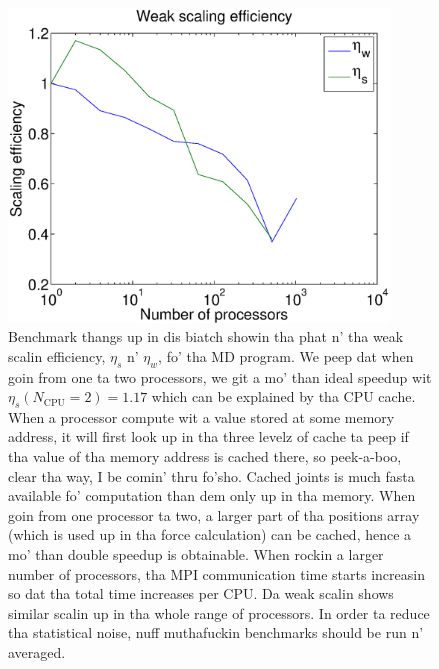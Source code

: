 \begin{figure}[htb]
\begin{center}
\includegraphics[width=0.9\textwidth, trim=0cm 0cm 0cm 0cm, clip]{MD/figures/scaling.eps}
\end{center}
\caption{Benchmark thangs up in dis biatch showin tha phat n' tha weak scalin efficiency, $\eta_s$ n' $\eta_w$, fo' tha MD program. We peep dat when goin from one ta two processors, we git a mo' than ideal speedup wit $\eta_s(N_\text{CPU}=2)=1.17$ which can be explained by tha CPU cache. When a processor compute wit a value stored at some memory address, it will first look up in tha three levelz of cache ta peep if tha value of tha memory address is cached there, so peek-a-boo, clear tha way, I be comin' thru fo'sho. Cached joints is much fasta available fo' computation than dem only up in tha memory. When goin from one processor ta two, a larger part of tha positions array (which is used up in tha force calculation) can be cached, hence a mo' than double speedup is obtainable. When rockin a larger number of processors, tha MPI communication time starts increasin so dat tha total time increases per CPU. Da weak scalin shows similar scalin up in tha whole range of processors. In order ta reduce tha statistical noise, nuff muthafuckin benchmarks should be run n' averaged.}
\label{fig:md_strong_scaling}
\end{figure}

